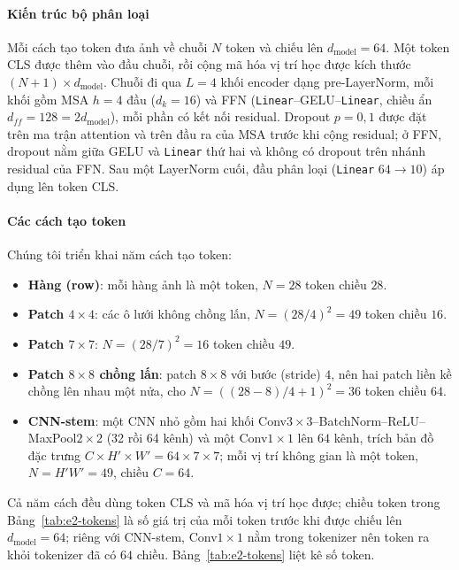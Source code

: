 \documentclass[a4paper,12pt]{article}
\begin{document}
\paragraph{Kiến trúc bộ phân loại} Mỗi cách tạo token đưa ảnh về chuỗi $N$ token và chiếu lên $d_{\text{model}}=64$. Một token CLS được thêm vào đầu chuỗi, rồi cộng mã hóa vị trí học được kích thước $(N+1)\times d_{\text{model}}$. Chuỗi đi qua $L=4$ khối encoder dạng pre-LayerNorm, mỗi khối gồm MSA $h=4$ đầu ($d_k=16$) và FFN (\texttt{Linear}--GELU--\texttt{Linear}, chiều ẩn $d_{ff}=128=2d_{\text{model}}$), mỗi phần có kết nối residual. Dropout $p=0{,}1$ được đặt trên ma trận attention và trên đầu ra của MSA trước khi cộng residual; ở FFN, dropout nằm giữa GELU và \texttt{Linear} thứ hai và không có dropout trên nhánh residual của FFN. Sau một LayerNorm cuối, đầu phân loại (\texttt{Linear} $64\to10$) áp dụng lên token CLS.

\paragraph{Các cách tạo token} Chúng tôi triển khai năm cách tạo token:
\begin{itemize}
    \item \textbf{Hàng (row)}: mỗi hàng ảnh là một token, $N=28$ token chiều $28$.
    \item \textbf{Patch $4\times4$}: các ô lưới không chồng lấn, $N=(28/4)^2=49$ token chiều $16$.
    \item \textbf{Patch $7\times7$}: $N=(28/7)^2=16$ token chiều $49$.
    \item \textbf{Patch $8\times8$ chồng lấn}: patch $8\times8$ với bước (stride) $4$, nên hai patch liền kề chồng lên nhau một nửa, cho $N=((28-8)/4+1)^2=36$ token chiều $64$.
    \item \textbf{CNN-stem}: một CNN nhỏ gồm hai khối Conv$3\times3$--BatchNorm--ReLU--MaxPool$2\times2$ (32 rồi 64 kênh) và một Conv$1\times1$ lên $64$ kênh, trích bản đồ đặc trưng $C\times H'\times W'=64\times7\times7$; mỗi vị trí không gian là một token, $N=H'W'=49$, chiều $C=64$.
\end{itemize}
Cả năm cách đều dùng token CLS và mã hóa vị trí học được; chiều token trong Bảng~\ref{tab:e2-tokens} là số giá trị của mỗi token trước khi được chiếu lên $d_{\text{model}}=64$; riêng với CNN-stem, Conv$1\times1$ nằm trong tokenizer nên token ra khỏi tokenizer đã có $64$ chiều. Bảng~\ref{tab:e2-tokens} liệt kê số token.
\end{document}
